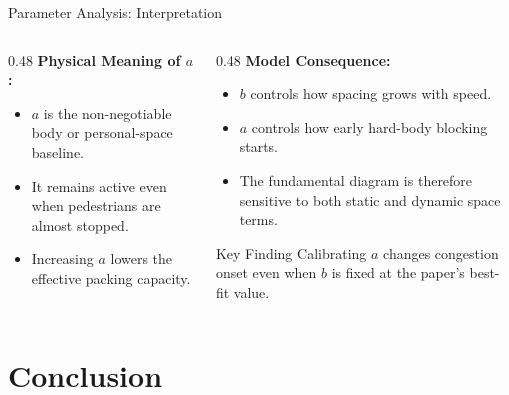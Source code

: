 \documentclass{beamer}
\begin{document}
\begin{frame}{Parameter Analysis: Interpretation}
\small
\begin{columns}[T,onlytextwidth]
    \begin{column}{0.48\textwidth}
        \textbf{Physical Meaning of $a$:}
        \begin{itemize}
            \item $a$ is the non-negotiable body or personal-space baseline.
            \item It remains active even when pedestrians are almost stopped.
            \item Increasing $a$ lowers the effective packing capacity.
        \end{itemize}
    \end{column}

    \begin{column}{0.48\textwidth}
        \textbf{Model Consequence:}
        \begin{itemize}
            \item $b$ controls how spacing grows with speed.
            \item $a$ controls how early hard-body blocking starts.
            \item The fundamental diagram is therefore sensitive to both static and dynamic space terms.
        \end{itemize}

        \begin{block}{Key Finding}
            Calibrating $a$ changes congestion onset even when $b$ is fixed at the paper's best-fit value.
        \end{block}
    \end{column}
\end{columns}
\end{frame}

\section{Conclusion}
\end{document}
